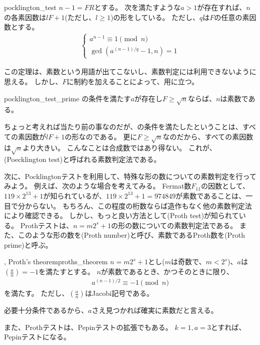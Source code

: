 \begin{Theo}{}{pocklington_test}
$n-1=FR$とする。
次を満たすような$a>1$が存在すれば、$n$の各素因数は$lF+1$(ただし、$l\ge1$)の形をしている。
ただし、$q$は$F$の任意の素因数とする。
\begin{align*}
\begin{cases}
a^{n-1} \equiv 1 \pmod{n}\\
\gcd(a^{(n-1)/q}-1, n) = 1
\end{cases}
\end{align*}
\end{Theo}

この定理は、素数という用語が出てこないし、素数判定には利用できないように思える。
しかし、$F$に制約を加えることによって、用に立つ。

\begin{Coro}{}{pocklington_test_prime}
の条件を満たす$a$が存在し$F\ge\sqrt{n}$ならば、$n$は素数である。
\end{Coro}

ちょっと考えれば当たり前の事なのだが、の条件を満たしたということは、すべての素因数が$lF+1$の形なのである。
更に$F\ge\sqrt{n}$なのだから、すべての素因数は$\sqrt{n}$より大きい。
こんなことは合成数ではあり得ない。
これが、(Poecklington test)と呼ばれる素数判定法である。


次に、Pocklingtonテストを利用して、特殊な形の数についての素数判定を行ってみよう。
例えば、次のような場合を考えてみる。
Fermat数$F_{11}$の因数として、$119\times2^{13}+1$が知られているが、$119\times2^{13}+1=974849$が素数であることは、一目で分からない。
もちろん、この程度の桁数ならば造作もなく他の素数判定法により確認できる。
しかし、もっと良い方法として(Proth test)が知られている。
Prothテストは、$n = m2^s+1$の形の数についての素数判定法である。
また、このような形の数を(Proth number)と呼び、素数であるProth数を(Proth prime)と呼ぶ。

\begin{Theo}{, Proth's theorem}{proths_theorem}
$n=m2^s+1$とし($m$は奇数で、$m<2^s$)、$a$は$\left(\frac{a}{n}\right)=-1$を満たすとする。
$n$が素数であるとき、かつそのときに限り、
\begin{align*}
a^{(n-1)/2} \equiv -1 \pmod{n}
\end{align*}
を満たす。
ただし、$\left(\frac{a}{n}\right)$はJacobi記号である。
\end{Theo}

必要十分条件であるから、$a$さえ見つかれば確実に素数だと言える。


また、Prothテストは、Pepinテストの拡張でもある。
$k=1,a=3$とすれば、Pepinテストになる。
